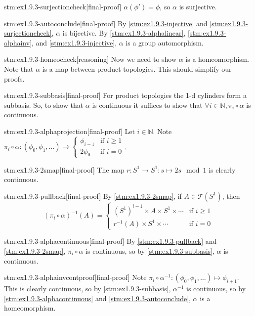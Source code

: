 \begin{stm}{stm:ex1.9.3-surjectioncheck}[final-proof]
$\alpha(\phi') = \phi$, so $\alpha$ is surjective.
\end{stm}

\begin{stm}{stm:ex1.9.3-autoconclude}[final-proof]
By \ref{stm:ex1.9.3-injective} and \ref{stm:ex1.9.3-surjectioncheck}, $\alpha$ is bijective. By \ref{stm:ex1.9.3-alphalinear}, \ref{stm:ex1.9.3-alphainv}, and \ref{stm:ex1.9.3-injective}, $\alpha$ is a group automorphism.
\end{stm} 

\begin{stm}{stm:ex1.9.3-homeocheck}[reasoning]
Now we need to show $\alpha$ is a homeomorphism. Note that $\alpha$ is a map between product topologies. This should simplify our proofs.
\end{stm}

\begin{stm}{stm:ex1.9.3-subbasis}[final-proof]
For product topologies the 1-d cylinders form a subbasis. So, to show that $\alpha$ is continuous it suffices to show that $\forall i \in \mathbb{N}, \pi_i \circ \alpha$ is continuous.
\end{stm}

\begin{stm}{stm:ex1.9.3-alphaprojection}[final-proof]
Let $i \in \mathbb{N}$. Note $\pi_i \circ \alpha : (\phi_0, \phi_1, \dots) \mapsto \begin{cases} \phi_{i-1} & \text{if } i \ge 1 \\ 2\phi_0 & \text{if } i = 0 \end{cases}$.
\end{stm}

\begin{stm}{stm:ex1.9.3-2smap}[final-proof]
The map $r : S^1 \to S^1 : s \mapsto 2s \mod 1$ is clearly continuous.
\end{stm}

\begin{stm}{stm:ex1.9.3-pullback}[final-proof]
By \ref{stm:ex1.9.3-2smap}, if $A \in \mathcal{T}(S^1)$, then 
\[
(\pi_i \circ \alpha)^{-1}(A) = 
\begin{cases}
(S^1)^{i-1} \times A \times S^1 \times \cdots & \text{if } i \ge 1 \\
r^{-1}(A) \times S^1 \times \cdots & \text{if } i = 0
\end{cases}
\]
\end{stm}

\begin{stm}{stm:ex1.9.3-alphacontinuous}[final-proof]
By \ref{stm:ex1.9.3-pullback} and \ref{stm:ex1.9.3-2smap}, $\pi_i \circ \alpha$ is continuous, so by \ref{stm:ex1.9.3-subbasis}, $\alpha$ is continuous.
\end{stm}

\begin{stm}{stm:ex1.9.3-alphainvcontproof}[final-proof]
Note $\pi_i \circ \alpha^{-1} : (\phi_0, \phi_1, \dots) \mapsto \phi_{i+1}$. This is clearly continuous, so by \ref{stm:ex1.9.3-subbasis}, $\alpha^{-1}$ is continuous, so by \ref{stm:ex1.9.3-alphacontinuous} and \ref{stm:ex1.9.3-autoconclude}, $\alpha$ is a homeomorphism.
\end{stm}
